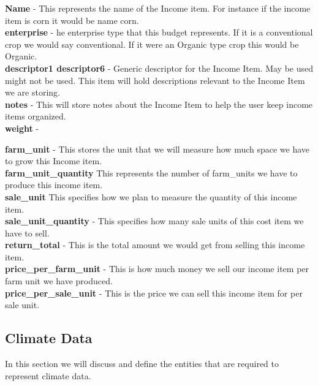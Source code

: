 \documentclass[onecolumn, draftclsnofoot,10pt, compsoc]{article}
\begin{document}
					\textbf{Name} - This represents the name of the Income item. For instance if the income item is corn it would be name corn.\\

					\textbf{enterprise} - he enterprise type that this budget represents. If it is a conventional crop we would say conventional. If it were an Organic type crop this would be Organic.\\

					\textbf{descriptor1 \- descriptor6} - Generic descriptor for the Income Item. May be used might not be used. This item will hold descriptions relevant to the Income Item we are storing.\\

					\textbf{notes} - This will store notes about the Income Item to help the user keep income items organized.\\

					\textbf{weight} -

					\textbf{farm\_unit} - This stores the unit that we will measure how much space we have to grow this Income item.\\

					\textbf{farm\_unit\_quantity} \- This represents the number of farm\_units we have to produce this income item.\\

					\textbf{sale\_unit} \- This specifies how we plan to measure the quantity of this income item.\\

					\textbf{sale\_unit\_quantity} - This specifies how many sale units of this cost item we have to sell.\\

					\textbf{return\_total} - This is the total amount we would get from selling this income item.\\

					\textbf{price\_per\_farm\_unit} - This is how much money we sell our income item per farm unit we have produced.\\

					\textbf{price\_per\_sale\_unit} - This is the price we can sell this income item for per sale unit.\\

		\subsection{Climate Data}
			In this section we will discuss and define the entities that are required to represent climate data.\\
\end{document}
